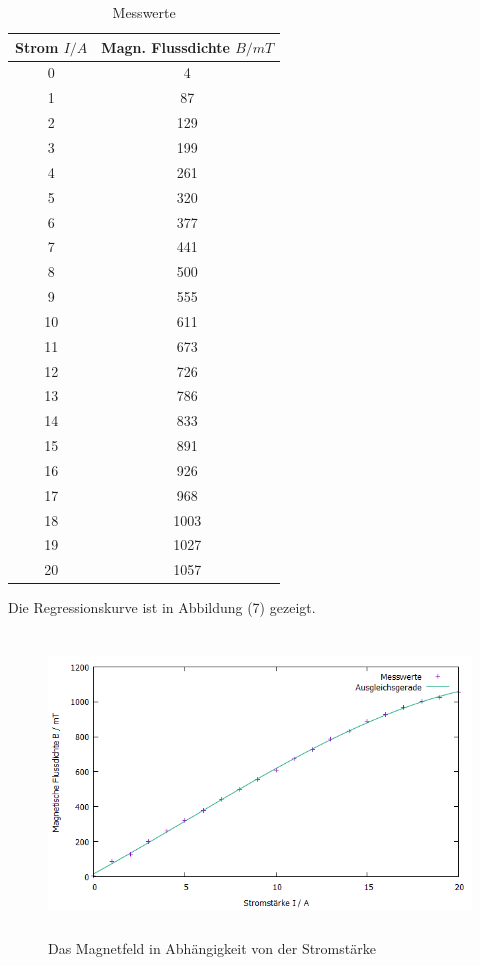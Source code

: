 \documentclass{article}
\begin{document}
	\begin{table} [H]
		\centering
		\begin{tabular}{c|c} \hline
			Strom $I / A$ & Magn. Flussdichte $B / mT$ \\ 
			\hline 
			0 & 4 \\
			1 & 87 \\
			2 & 129 \\
			3 & 199 \\
			4 & 261 \\
			5 & 320 \\
			6 & 377 \\
			7 & 441 \\
			8 & 500 \\
			9 & 555\\
			10 & 611 \\
			11 & 673\\
			12 & 726 \\
			13 & 786 \\
			14 & 833 \\
			15 & 891 \\
			16 & 926 \\
			17 & 968 \\
			18 & 1003 \\
			19 & 1027 \\
			20 & 1057 \\
			\hline
		\end{tabular} 	
		
		\caption{Messwerte }
		\label {tab:threecols}
	\end{table}
Die Regressionskurve ist in Abbildung (7) gezeigt. 
\begin{figure}[H]
	\centering
	\includegraphics[height=8cm,width=12cm]{bfeld.png}
	\caption{ Das Magnetfeld in Abhängigkeit von der Stromstärke }
	\label{fig: abb. 1}
\end{figure} 
\end{document}
